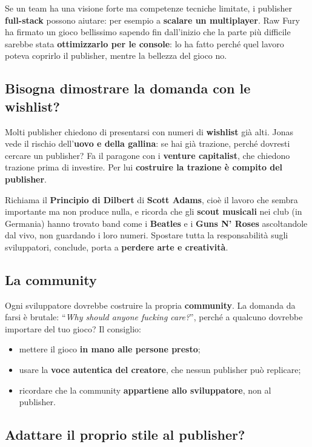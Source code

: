 Se un team ha una visione forte ma competenze tecniche limitate, i publisher
\textbf{full-stack} possono aiutare: per esempio a \textbf{scalare un
multiplayer}. Raw Fury ha firmato un gioco bellissimo sapendo fin dall'inizio che
la parte più difficile sarebbe stata \textbf{ottimizzarlo per le console}: lo ha
fatto perché quel lavoro poteva coprirlo il publisher, mentre la bellezza del gioco
no.

\subsection{Bisogna dimostrare la domanda con le wishlist?}

Molti publisher chiedono di presentarsi con numeri di \textbf{wishlist} già alti.
Jonas vede il rischio dell'\textbf{uovo e della gallina}: se hai già trazione,
perché dovresti cercare un publisher? Fa il paragone con i \textbf{venture
capitalist}, che chiedono trazione prima di investire. Per lui
\textbf{costruire la trazione è compito del publisher}.

Richiama il \textbf{Principio di Dilbert} di \textbf{Scott Adams}, cioè il lavoro
che sembra importante ma non produce nulla, e ricorda che gli \textbf{scout
musicali} nei club (in Germania) hanno trovato band come i \textbf{Beatles} e i
\textbf{Guns N' Roses} ascoltandole dal vivo, non guardando i loro numeri.
Spostare tutta la responsabilità sugli sviluppatori, conclude, porta a
\textbf{perdere arte e creatività}.

\subsection{La community}

Ogni sviluppatore dovrebbe costruire la propria \textbf{community}. La domanda da
farsi è brutale: ``\emph{Why should anyone fucking care?}'', perché a qualcuno
dovrebbe importare del tuo gioco? Il consiglio:
\begin{itemize}
  \item mettere il gioco \textbf{in mano alle persone presto};
  \item usare la \textbf{voce autentica del creatore}, che nessun publisher può
        replicare;
  \item ricordare che la community \textbf{appartiene allo sviluppatore}, non al
        publisher.
\end{itemize}

\subsection{Adattare il proprio stile al publisher?}

